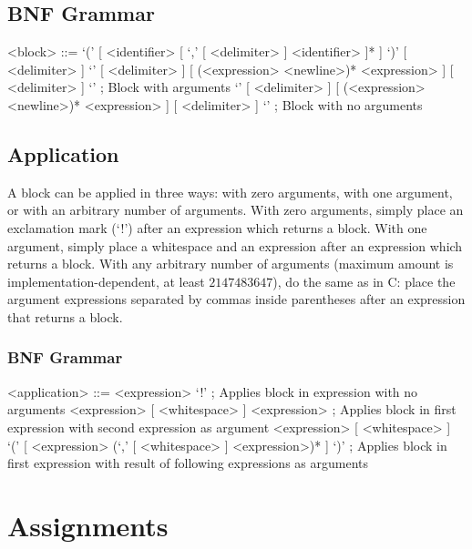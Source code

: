 \documentclass[letterpaper,titlepage]{scrreprt}
\begin{document}
\subsection{BNF Grammar}
\label{subsec:BlockBNF}

\begin{grammar}

<block> ::= `(' [ <identifier> [ `,' [ <delimiter> ] <identifier> ]* ] `)' [ <delimiter> ] `{' [ <delimiter> ] [ (<expression> <newline>)* <expression> ] [ <delimiter> ] `}' ; Block with arguments
\alt `{' [ <delimiter> ] [ (<expression> <newline>)* <expression> ] [ <delimiter> ] `}' ; Block with no arguments

\end{grammar}

\subsection{Application}
\label{subsec:Application}

A block can be applied in three ways: with zero arguments, with one argument, or with an arbitrary number of arguments. With zero arguments, simply place an exclamation mark (`!') after an expression which returns a block. With one argument, simply place a whitespace and an expression after an expression which returns a block. With any arbitrary number of arguments (maximum amount is implementation-dependent, at least $2147483647$), do the same as in C: place the argument expressions separated by commas inside parentheses after an expression that returns a block.

\subsubsection{BNF Grammar}
\label{subsubsec:ApplicationBNF}

\begin{grammar}

<application> ::= <expression> `!' ; Applies block in expression with no arguments
\alt <expression> [ <whitespace> ] <expression> ; Applies block in first expression with second expression as argument
\alt <expression> [ <whitespace> ] `(' [ <expression> (`,' [ <whitespace> ] <expression>)* ] `)' ; Applies block in first expression with result of following expressions as arguments

\end{grammar}

\section{Assignments}
\label{sec:Assignments}
\end{document}
